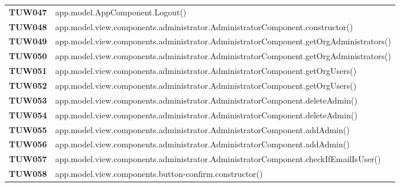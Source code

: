 \documentclass[../../piano-di-qualifica.tex]{subfiles}
\begin{document}
\begin{longtable}[H]{>{\centering\bfseries}m{3cm} >{}m{13cm}}
  TUW047             & app.model.AppComponent.Logout\@()                                                                       \\


  TUW048             & app.model.view.components.administrator.AdministratorComponent.constructor\@()                          \\

  TUW049             & app.model.view.components.administrator.AdministratorComponent.getOrgAdministrators\@()                 \\

  TUW050             & app.model.view.components.administrator.AdministratorComponent.getOrgAdministrators\@()                 \\

  TUW051             & app.model.view.components.administrator.AdministratorComponent.getOrgUsers\@()                          \\

  TUW052             & app.model.view.components.administrator.AdministratorComponent.getOrgUsers\@()                          \\

  TUW053             & app.model.view.components.administrator.AdministratorComponent.deleteAdmin\@()                          \\

  TUW054             & app.model.view.components.administrator.AdministratorComponent.deleteAdmin\@()                          \\

  TUW055             & app.model.view.components.administrator.AdministratorComponent.addAdmin\@()                             \\

  TUW056             & app.model.view.components.administrator.AdministratorComponent.addAdmin\@()                             \\

  TUW057             & app.model.view.components.administrator.AdministratorComponent.checkIfEmailIsUser\@()                   \\


  TUW058             & app.model.view.components.button-confirm.constructor\@()                                                \\


\end{longtable}
\end{document}
